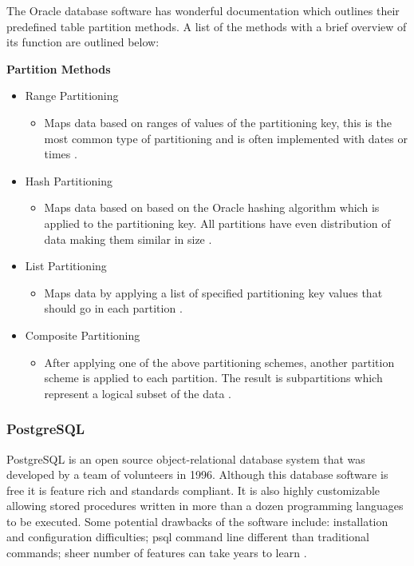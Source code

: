 \documentclass[draftclsnofoot, onecolumn, compsoc, 10pt]{IEEEtran}
\begin{document}
The Oracle database software has wonderful documentation which outlines their predefined table partition methods. A list of the methods with a brief overview of its function are outlined below:

\textbf{Partition Methods}
\begin{itemize} 
	\item  Range Partitioning
    \begin{itemize} 
		\item Maps data based on ranges of values of the partitioning key, this is the most common type of partitioning and is often implemented with dates or times \cite{Partitioning Concepts}.
    \end{itemize}
    \item Hash Partitioning
    \begin{itemize} 
		\item Maps data based on based on the Oracle hashing algorithm which is applied to the partitioning key.
        All partitions have even distribution of data making them similar in size \cite{Partitioning Concepts}.
    \end{itemize}
    \item List Partitioning
    \begin{itemize} 
		\item Maps data by applying a list of specified partitioning key values that should go in each partition \cite{Partitioning Concepts}.
    \end{itemize}
    \item Composite Partitioning
    \begin{itemize} 
		\item After applying one of the above partitioning schemes, another partition scheme is applied to each partition.
        The result is subpartitions which represent a logical subset of the data \cite{Partitioning Concepts}.
    \end{itemize}
\end{itemize}

\subsubsection{PostgreSQL}
PostgreSQL is an open source object-relational database system that was developed by a team of volunteers in 1996.
Although this database software is free it is feature rich and standards compliant.
It is also highly customizable allowing stored procedures written in more than a dozen programming languages to be executed.
Some potential drawbacks of the software include: installation and configuration difficulties; psql command line different than traditional commands; sheer number of features can take years to learn \cite{General Information - PostegreSQL}.
\end{document}
